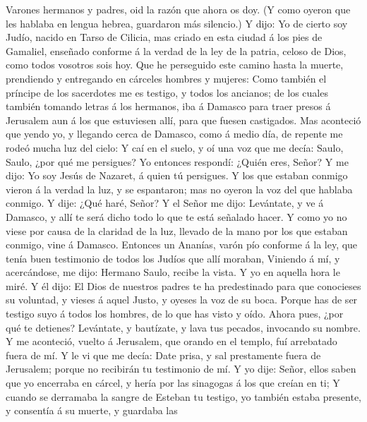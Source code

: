  Varones hermanos y padres, oid la razón que ahora os doy.
 (Y como oyeron que les hablaba en lengua hebrea,
guardaron más silencio.) Y dijo:  Yo de cierto soy Judío,
nacido en Tarso de Cilicia, mas criado en esta ciudad á los pies de
Gamaliel, enseñado conforme á la verdad de la ley de la patria, celoso
de Dios, como todos vosotros sois hoy.  Que he perseguido
este camino hasta la muerte, prendiendo y entregando en cárceles hombres
y mujeres:  Como también el príncipe de los sacerdotes me
es testigo, y todos los ancianos; de los cuales también tomando letras á
los hermanos, iba á Damasco para traer presos á Jerusalem aun á los que
estuviesen allí, para que fuesen castigados.  Mas
aconteció que yendo yo, y llegando cerca de Damasco, como á medio día,
de repente me rodeó mucha luz del cielo:  Y caí en el
suelo, y oí una voz que me decía: Saulo, Saulo, ¿por qué me persigues?
 Yo entonces respondí: ¿Quién eres, Señor? Y me dijo: Yo
soy Jesús de Nazaret, á quien tú persigues.  Y los que
estaban conmigo vieron á la verdad la luz, y se espantaron; mas no
oyeron la voz del que hablaba conmigo.  Y dije: ¿Qué
haré, Señor? Y el Señor me dijo: Levántate, y ve á Damasco, y allí te
será dicho todo lo que te está señalado hacer.  Y como yo
no viese por causa de la claridad de la luz, llevado de la mano por los
que estaban conmigo, vine á Damasco.  Entonces un
Ananías, varón pío conforme á la ley, que tenía buen testimonio de todos
los Judíos que allí moraban,  Viniendo á mí, y
acercándose, me dijo: Hermano Saulo, recibe la vista. Y yo en aquella
hora le miré.  Y él dijo: El Dios de nuestros padres te
ha predestinado para que conocieses su voluntad, y vieses á aquel Justo,
y oyeses la voz de su boca.  Porque has de ser testigo
suyo á todos los hombres, de lo que has visto y oído. 
Ahora pues, ¿por qué te detienes? Levántate, y bautízate, y lava tus
pecados, invocando su nombre.  Y me aconteció, vuelto á
Jerusalem, que orando en el templo, fuí arrebatado fuera de mí.
 Y le vi que me decía: Date prisa, y sal prestamente
fuera de Jerusalem; porque no recibirán tu testimonio de mí.
 Y yo dije: Señor, ellos saben que yo encerraba en
cárcel, y hería por las sinagogas á los que creían en ti;
 Y cuando se derramaba la sangre de Esteban tu testigo,
yo también estaba presente, y consentía á su muerte, y guardaba las

